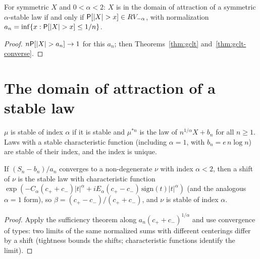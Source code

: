 \begin{theorem}
  \label{thm:doa-symm-stable-iff}
  \leanok
  For symmetric $X$ and $0 < \alpha < 2$: $X$ is in the domain of attraction of a symmetric $\alpha$-stable law if and only if
  $\mathsf{P}[|X| > x] \in RV_{-\alpha}$, with normalization $a_n = \inf\{x : \mathsf{P}[|X| > x] \le 1/n\}$.
\end{theorem}
\begin{proof}
  \leanok
  $n\mathsf{P}[|X| > a_n] \to 1$ for this $a_n$; then Theorems~\ref{thm:gclt} and~\ref{thm:gclt-converse}.
\end{proof}

\section{The domain of attraction of a stable law}

\begin{definition}
  \label{def:is-stable-index}
  \leanok
  $\mu$ is stable of index $\alpha$ if it is stable and $\mu^{*n}$ is the law of $n^{1/\alpha} X + b_n$ for all $n \ge 1$. Laws with a
  stable characteristic function (including $\alpha = 1$, with $b_n = e\, n \log n$) are stable of their index, and the
  index is unique.
\end{definition}

\begin{theorem}
  \label{thm:stable-limit-identification}
  \leanok
  If $(S_n - b_n)/a_n$ converges to a non-degenerate $\nu$ with index $\alpha < 2$, then a shift of $\nu$ is the stable law
  with characteristic function $\exp(-C_\alpha(c_+ + c_-)|t|^\alpha + i E_\alpha (c_+ - c_-)\,\mathrm{sign}(t)|t|^\alpha)$ (and the
  analogous $\alpha = 1$ form), so $\beta = (c_+ - c_-)/(c_+ + c_-)$, and $\nu$ is stable of index $\alpha$.
\end{theorem}
\begin{proof}
  \leanok
  Apply the sufficiency theorem along $a_n (c_+ + c_-)^{1/\alpha}$ and use convergence of types: two limits of the same
  normalized sums with different centerings differ by a shift (tightness bounds the shifts; characteristic functions
  identify the limit).
\end{proof}

